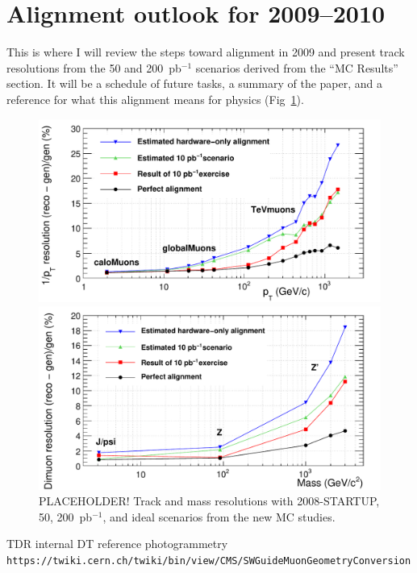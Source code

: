 \documentclass[12pt]{article}
\begin{document}
\section{Alignment outlook for 2009--2010}

This is where I will review the steps toward alignment in 2009 and
present track resolutions from the 50 and 200~pb$^{-1}$ scenarios
derived from the ``MC Results'' section.  It will be a schedule of
future tasks, a summary of the paper, and a reference for what this
alignment means for physics (Fig~\ref{fig:curvature_resolution}).

\begin{figure}
\begin{center}
\includegraphics[width=0.75\linewidth]{curvature_resolution.pdf}

\includegraphics[width=0.75\linewidth]{mass_resolution.pdf}
\end{center}
\caption{PLACEHOLDER!  Track and mass resolutions with 2008-STARTUP, 50, 200~pb$^{-1}$, and ideal scenarios from the new MC studies. \label{fig:curvature_resolution}}
\end{figure}

\begin{thebibliography}{99}

 TDR
 internal DT reference
 photogrammetry
 {\tt https://twiki.cern.ch/twiki/bin/view/CMS/SWGuideMuonGeometryConversion}

\end{thebibliography}
\end{document}
